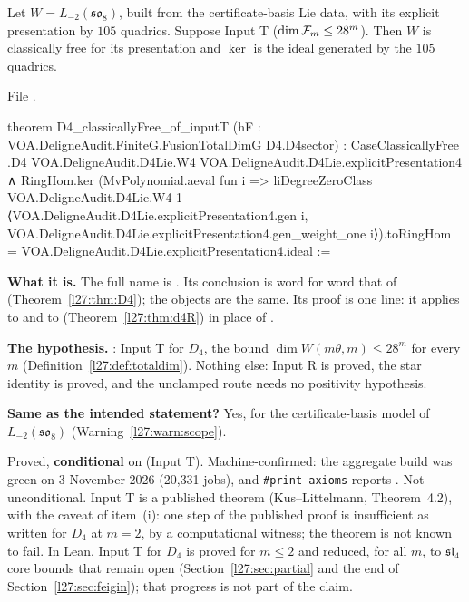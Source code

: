 \begin{theorem}\label{l27:thm:d4inputT}
Let $W=L_{-2}(\mathfrak{so}_8)$, built from the certificate-basis Lie data, with its explicit presentation by $105$ quadrics. Suppose
Input T ($\dim\mathcal F_m\le28^m$). Then $W$ is classically free for its presentation and $\ker$ is the ideal generated by the
$105$ quadrics.
\end{theorem}
\noindent File .
\begin{leancode}
theorem D4_classicallyFree_of_inputT (hF : VOA.DeligneAudit.FiniteG.FusionTotalDimG D4.D4sector) :
    CaseClassicallyFree .D4 VOA.DeligneAudit.D4Lie.W4 VOA.DeligneAudit.D4Lie.explicitPresentation4 ∧
      RingHom.ker (MvPolynomial.aeval fun i =>
        liDegreeZeroClass VOA.DeligneAudit.D4Lie.W4 1
          ⟨VOA.DeligneAudit.D4Lie.explicitPresentation4.gen i,
            VOA.DeligneAudit.D4Lie.explicitPresentation4.gen_weight_one i⟩).toRingHom =
        VOA.DeligneAudit.D4Lie.explicitPresentation4.ideal :=
\end{leancode}

\begin{dictionary}
\textbf{What it is.} The full name is . Its conclusion is word for
word that of  (Theorem~\ref{l27:thm:D4}); the objects are the same. Its proof is one line: it applies
 to  and to  (Theorem~\ref{l27:thm:d4R}) in place of
.

\textbf{The hypothesis.} : Input T for $D_4$, the bound $\dim W(m\theta,m)\le28^m$ for every $m$ (Definition~\ref{l27:def:totaldim}).
Nothing else: Input R is proved, the star identity is proved, and the unclamped route needs no positivity hypothesis.

\textbf{Same as the intended statement?} Yes, for the certificate-basis model of $L_{-2}(\mathfrak{so}_8)$ (Warning~\ref{l27:warn:scope}).
\end{dictionary}

\begin{status}
Proved, \textbf{conditional} on  (Input T). Machine-confirmed: the aggregate build was green
on 3 November 2026 (20{,}331 jobs), and \texttt{\#print axioms} reports . Not
unconditional. Input T is a published theorem (Kus--Littelmann, Theorem~4.2), with the caveat of item~(i): one step of the
published proof is insufficient as written for $D_4$ at $m=2$, by a computational witness; the theorem is not known to fail.
In Lean, Input T for $D_4$ is proved for $m\le2$ and reduced, for all $m$, to $\mathfrak{sl}_4$ core bounds that remain open
(Section~\ref{l27:sec:partial} and the end of Section~\ref{l27:sec:feigin}); that progress is not part of the claim.
\end{status}

